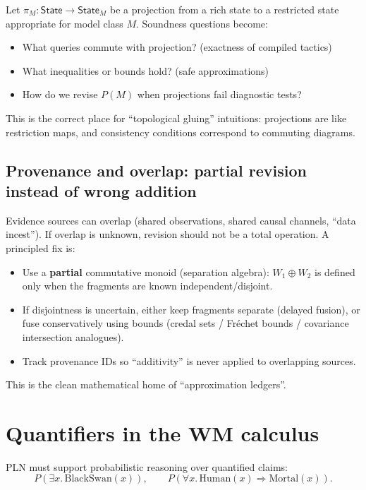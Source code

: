 \documentclass[11pt]{article}
\newcommand{\State}{\mathsf{State}}
\newcommand{\revise}{\mathbin{\oplus}}   %
\begin{document}
Let $\pi_M : \State \to \State_M$ be a projection from a rich state to a restricted state
appropriate for model class $M$. Soundness questions become:
\begin{itemize}[leftmargin=2em]
\item What queries commute with projection? (exactness of compiled tactics)
\item What inequalities or bounds hold? (safe approximations)
\item How do we revise $P(M)$ when projections fail diagnostic tests?
\end{itemize}

This is the correct place for ``topological gluing'' intuitions:
projections are like restriction maps, and consistency conditions correspond to commuting diagrams.

\subsection{Provenance and overlap: partial revision instead of wrong addition}

Evidence sources can overlap (shared observations, shared causal channels, ``data incest'').
If overlap is unknown, revision should not be a total operation. A principled fix is:

\begin{itemize}[leftmargin=2em]
\item Use a \textbf{partial} commutative monoid (separation algebra):
$W_1 \revise W_2$ is defined only when the fragments are known independent/disjoint.
\item If disjointness is uncertain, either keep fragments separate (delayed fusion),
or fuse conservatively using bounds (credal sets / Fr\'echet bounds / covariance intersection analogues).
\item Track provenance IDs so ``additivity'' is never applied to overlapping sources.
\end{itemize}

This is the clean mathematical home of ``approximation ledgers''.

\section{Quantifiers in the WM calculus}

PLN must support probabilistic reasoning over quantified claims:
\[
  P(\exists x.\,\mathrm{BlackSwan}(x)),\qquad
  P(\forall x.\,\mathrm{Human}(x)\Rightarrow \mathrm{Mortal}(x)).
\]
\end{document}
